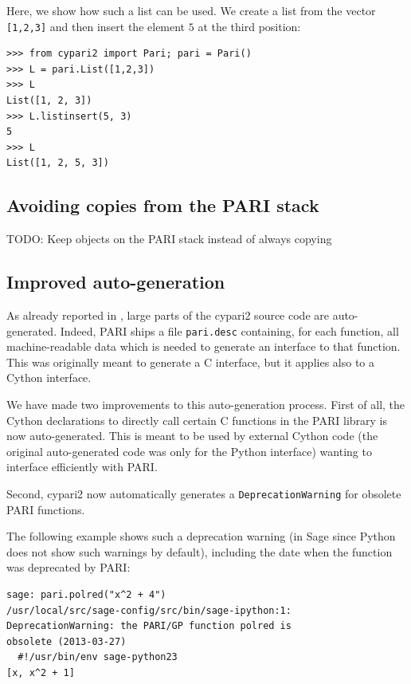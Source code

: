 \documentclass{deliverablereport}
\begin{document}
Here, we show how such a list can be used.
We create a list from the vector \verb/[1,2,3]/ and then insert the
element $5$ at the third position:
\begin{verbatim}
>>> from cypari2 import Pari; pari = Pari()
>>> L = pari.List([1,2,3])
>>> L
List([1, 2, 3])
>>> L.listinsert(5, 3)
5
>>> L
List([1, 2, 5, 3])
\end{verbatim}

\subsection{Avoiding copies from the PARI stack}

TODO: Keep objects on the PARI stack instead of always copying

\subsection{Improved auto-generation}

As already reported in ,
large parts of the cypari2 source code are auto-generated.
Indeed, PARI ships a file \verb/pari.desc/ containing,
for each function, all machine-readable data which is needed to generate
an interface to that function.
This was originally meant to generate a C interface,
but it applies also to a Cython interface.

We have made two improvements to this auto-generation process.
First of all,
the Cython declarations to directly call certain C functions
in the PARI library is now auto-generated.
This is meant to be used by external Cython code
(the original auto-generated code was only for the Python interface)
wanting to interface efficiently with PARI.


Second, cypari2 now automatically
generates a \texttt{DeprecationWarning}
for obsolete PARI functions.

The following example shows such a deprecation warning
(in Sage since Python does not show such warnings by default),
including the date when the function was deprecated by PARI:
\begin{verbatim}
sage: pari.polred("x^2 + 4")
/usr/local/src/sage-config/src/bin/sage-ipython:1:
DeprecationWarning: the PARI/GP function polred is
obsolete (2013-03-27)
  #!/usr/bin/env sage-python23
[x, x^2 + 1]
\end{verbatim}
\end{document}
